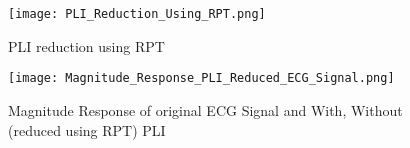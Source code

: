 \documentclass[conference]{IEEEtran}
\begin{document}
\begin{figure}[!h]
\centering
 \texttt{[image: PLI\_Reduction\_Using\_RPT.png]} 
\caption[PLI reduction using RPT]{PLI reduction using RPT}
\label{PLI reduction using RPT}
\end{figure}
\begin{figure}[!h]
\centering
 \texttt{[image: Magnitude\_Response\_PLI\_Reduced\_ECG\_Signal.png]} 
\caption[Magnitude Response of original ECG Signal and With, Without (reduced using RPT) PLI]{Magnitude Response of original ECG Signal and With, Without (reduced using RPT) PLI}
\label{Magnitude Response of original ECG Signal and With, Without (reduced using RPT) PLI}
\end{figure}
\end{document}
